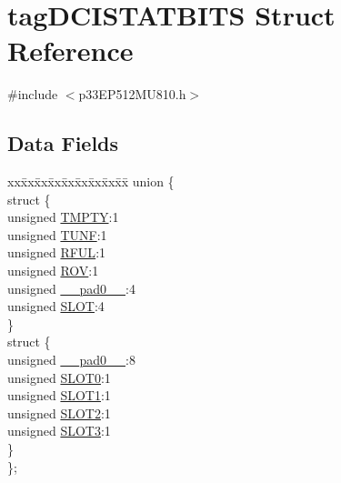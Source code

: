 \hypertarget{structtag_d_c_i_s_t_a_t_b_i_t_s}{}\section{tag\+D\+C\+I\+S\+T\+A\+T\+B\+I\+TS Struct Reference}
\label{structtag_d_c_i_s_t_a_t_b_i_t_s}


{\ttfamily \#include $<$p33\+E\+P512\+M\+U810.\+h$>$}

\subsection*{Data Fields}
\begin{DoxyCompactItemize}
\item 
\begin{tabbing}
xx\=xx\=xx\=xx\=xx\=xx\=xx\=xx\=xx\=\kill
union \{\\
\>struct \{\\
\>\>unsigned \hyperlink{structtag_d_c_i_s_t_a_t_b_i_t_s_a69245e256f3c7da3a48dd0d486140e7b}{TMPTY}:1\\
\>\>unsigned \hyperlink{structtag_d_c_i_s_t_a_t_b_i_t_s_a1e6631b91a8ea3dc49c1fb4294189225}{TUNF}:1\\
\>\>unsigned \hyperlink{structtag_d_c_i_s_t_a_t_b_i_t_s_a789742120f5bf96781c9fcb9db0c2151}{RFUL}:1\\
\>\>unsigned \hyperlink{structtag_d_c_i_s_t_a_t_b_i_t_s_aaff0c700092a60777675fc3cc83d51a0}{ROV}:1\\
\>\>unsigned \hyperlink{structtag_d_c_i_s_t_a_t_b_i_t_s_adf71f3d8410c1f1dbbc96680a92c49af}{\_\_pad0\_\_}:4\\
\>\>unsigned \hyperlink{structtag_d_c_i_s_t_a_t_b_i_t_s_ae2ea50195d8088e2558767729f38ad25}{SLOT}:4\\
\>\} \\
\>struct \{\\
\>\>unsigned \hyperlink{structtag_d_c_i_s_t_a_t_b_i_t_s_adf71f3d8410c1f1dbbc96680a92c49af}{\_\_pad0\_\_}:8\\
\>\>unsigned \hyperlink{structtag_d_c_i_s_t_a_t_b_i_t_s_af7d1fd3759ec3c9d18635a4ce7522911}{SLOT0}:1\\
\>\>unsigned \hyperlink{structtag_d_c_i_s_t_a_t_b_i_t_s_a194f6787a77ff9648290eecc54d84c21}{SLOT1}:1\\
\>\>unsigned \hyperlink{structtag_d_c_i_s_t_a_t_b_i_t_s_a7ae626314f9b669b9f06ab8dc408a23d}{SLOT2}:1\\
\>\>unsigned \hyperlink{structtag_d_c_i_s_t_a_t_b_i_t_s_a9242c889a8577b2ed362b8619363d89c}{SLOT3}:1\\
\>\} \\
\}; \\

\end{tabbing}\end{DoxyCompactItemize}



